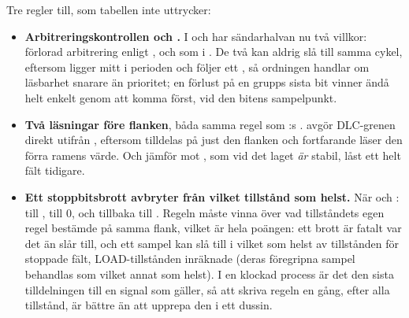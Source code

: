 Tre regler till, som tabellen inte uttrycker:
\begin{itemize}
  \item \textbf{Arbitreringskontrollen och .} I  och
     har sändarhalvan nu två villkor: förlorad arbitrering enligt
    , och  som i . De två kan aldrig slå
    till samma cykel, eftersom  ligger mitt i perioden och  följer ett
    , så ordningen handlar om läsbarhet snarare än prioritet; en förlust på en grupps
    sista bit vinner ändå helt enkelt genom att komma först, vid den bitens sampelpunkt.
  \item \textbf{Två läsningar före flanken}, båda samma regel som :s
    .  avgör DLC-grenen direkt utifrån
    , eftersom  tilldelas på just den flanken och
    fortfarande läser den förra ramens värde. Och  jämför mot ,
    som vid det laget \emph{är} stabil, låst ett helt fält tidigare.
  \item \textbf{Ett stoppbitsbrott avbryter från vilket tillstånd som helst.} När 
    och :  till ,  till 0, och
    tillbaka till . Regeln måste vinna över vad tillståndets egen regel bestämde på
    samma flank, vilket är hela poängen: ett brott är fatalt var det än slår till, och ett sampel kan
    slå till i vilket som helst av tillstånden för stoppade fält, LOAD-tillstånden inräknade (deras
    föregripna sampel behandlas som vilket annat som helst). I en klockad process är det den sista
    tilldelningen till en signal som gäller, så att skriva regeln en gång, efter alla tillstånd, är
    bättre än att upprepa den i ett dussin.
\end{itemize}

